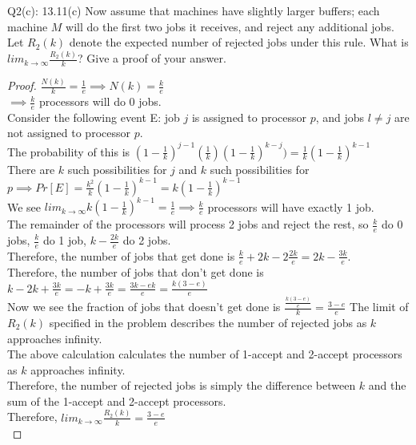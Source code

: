 \begin{problem}
    {Q2(c): 13.11(c)}
    Now assume that machines have slightly larger buffers; each machine $M$ will do the first two jobs it receives, and reject any additional jobs. Let
    $R_2(k)$ denote the expected number of rejected jobs under this rule. What is $lim_{k \rightarrow \infty} \frac{R_2(k)}{k}$? Give a proof of your
    answer.
    \begin{proof}
        $\frac{N(k)}{k} = \frac{1}{e} \implies N(k) = \frac{k}{e}$ \\
        $\implies \frac{k}{e}$ processors will do $0$ jobs. \\
        Consider the following event E: job $j$ is assigned to processor $p$, and jobs $l \neq j$ are not assigned to processor $p$. \\
        The probability of this is $(1 - \frac{1}{k})^{j-1}(\frac{1}{k})(1 - \frac{1}{k})^{k - j}) = \frac{1}{k}(1-\frac{1}{k})^{k - 1}$ \\
        There are $k$ such possibilities for $j$ and $k$ such possibilities for $p \implies Pr[E] = \frac{k^2}{k}(1 - \frac{1}{k})^{k-1} = k(1 - \frac{1}{k})^{k-1}$ \\
        We see $lim_{k \rightarrow \infty}k(1 - \frac{1}{k})^{k-1} = \frac{1}{e} \implies \frac{k}{e}$ processors will have exactly 1 job. \\
        The remainder of the processors will process 2 jobs and reject the rest, so $\frac{k}{e}$ do 0 jobs, $\frac{k}{e}$ do 1 job, $k -
        \frac{2k}{e}$ do 2 jobs. \\
        Therefore, the number of jobs that get done is $\frac{k}{e} + 2k - 2\frac{2k}{e} = 2k - \frac{3k}{e}$. \\
        Therefore, the number of jobs that don't get done is $k - 2k + \frac{3k}{e} = -k + \frac{3k}{e} = \frac{3k - ek}{e} = \frac{k(3 - e)}{e}$ \\
        Now we see the fraction of jobs that doesn't get done is $\frac{\frac{k(3-e)}{e}}{k} = \frac{3-e}{e}$
        The limit of $R_2(k)$ specified in the problem describes the number of rejected jobs as $k$ approaches infinity. \\
        The above calculation calculates the number of 1-accept and 2-accept processors as $k$ approaches infinity. \\
        Therefore, the number of rejected jobs is simply the difference between $k$ and the sum of the 1-accept and 2-accept processors. \\
        Therefore, $lim_{k \rightarrow \infty} \frac{R_2(k)}{k} = \frac{3-e}{e}$ \\
    \end{proof}
\end{problem}
